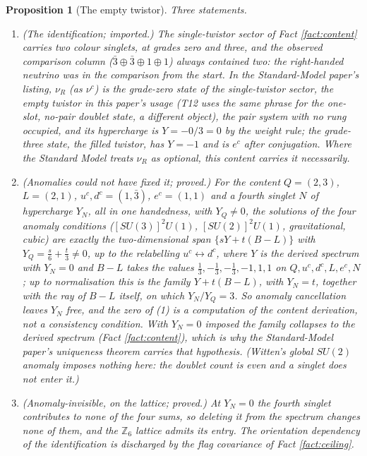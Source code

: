 \documentclass[11pt]{article}
\newtheorem{proposition}[theorem]{Proposition}
\theoremstyle{definition}
\begin{document}
\begin{proposition}[The empty twistor]\label{prop:empty}
Three statements.
\begin{enumerate}
\item \emph{(The identification; imported.)} The single-twistor sector of Fact \ref{fact:content} carries two colour singlets, at grades zero and three, and the observed comparison column ($\bar{3} \oplus \bar{3} \oplus 1 \oplus 1$) always contained two: the right-handed neutrino was in the comparison from the start. In the Standard-Model paper's listing, $\nu_{R}$ (as $\nu^{c}$) is the grade-zero state of the single-twistor sector, the \emph{empty twistor} in this paper's usage (T12 uses the same phrase for the one-slot, no-pair doublet state, a different object), the pair system with no rung occupied, and its hypercharge is $Y = -0/3 = 0$ by the weight rule; the grade-three state, the filled twistor, has $Y = -1$ and is $e^{c}$ after conjugation. Where the Standard Model treats $\nu_{R}$ as optional, this content carries it necessarily.
\item \emph{(Anomalies could not have fixed it; proved.)} For the content $Q = (2,3)$, $L = (2,1)$, $u^{c}, d^{c} = (1,\bar{3})$, $e^{c} = (1,1)$ and a fourth singlet $N$ of hypercharge $Y_{N}$, all in one handedness, with $Y_{Q} \neq 0$, the solutions of the four anomaly conditions ($[SU(3)]^{2}U(1)$, $[SU(2)]^{2}U(1)$, gravitational, cubic) are \emph{exactly} the two-dimensional span $\{sY + t(B - L)\}$ with $Y_{Q} = \tfrac{s}{6} + \tfrac{t}{3} \neq 0$, up to the relabelling $u^{c} \leftrightarrow d^{c}$, where $Y$ is the derived spectrum with $Y_{N} = 0$ and $B - L$ takes the values $\tfrac13, -\tfrac13, -\tfrac13, -1, 1, 1$ on $Q, u^{c}, d^{c}, L, e^{c}, N$; up to normalisation this is the family $Y + t(B - L)$, with $Y_{N} = t$, together with the ray of $B - L$ itself, on which $Y_{N}/Y_{Q} = 3$. So anomaly cancellation leaves $Y_{N}$ free, and the zero of (1) is a computation of the content derivation, not a consistency condition. With $Y_{N} = 0$ imposed the family collapses to the derived spectrum (Fact \ref{fact:content}), which is why the Standard-Model paper's uniqueness theorem carries that hypothesis. (Witten's global $SU(2)$ anomaly imposes nothing here: the doublet count is even and a singlet does not enter it.)
\item \emph{(Anomaly-invisible, on the lattice; proved.)} At $Y_{N} = 0$ the fourth singlet contributes to none of the four sums, so deleting it from the spectrum changes none of them, and the $\mathbb{Z}_{6}$ lattice admits its entry. The orientation dependency of the identification is discharged by the flag covariance of Fact \ref{fact:ceiling}.
\end{enumerate}
\end{proposition}
\end{document}
